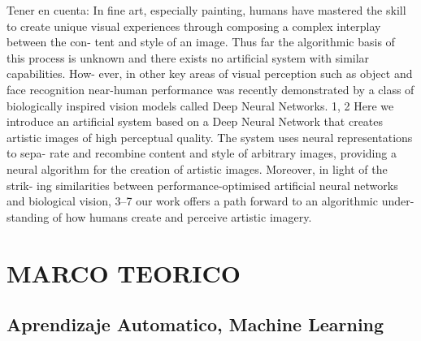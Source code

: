 \documentclass[a4paper,10pt]{article}
\begin{document}
Tener en cuenta:
In fine art, especially painting, humans have mastered the skill to create unique
visual experiences through composing a complex interplay between the con-
tent and style of an image. Thus far the algorithmic basis of this process is
unknown and there exists no artificial system with similar capabilities. How-
ever, in other key areas of visual perception such as object and face recognition
near-human performance was recently demonstrated by a class of biologically
inspired vision models called Deep Neural Networks. 1, 2 Here we introduce an
artificial system based on a Deep Neural Network that creates artistic images
of high perceptual quality. The system uses neural representations to sepa-
rate and recombine content and style of arbitrary images, providing a neural
algorithm for the creation of artistic images. Moreover, in light of the strik-
ing similarities between performance-optimised artificial neural networks and
biological vision, 3–7 our work offers a path forward to an algorithmic under-
standing of how humans create and perceive artistic imagery.

\section{MARCO TEORICO}




  \subsection{Aprendizaje Automatico, Machine Learning}
\end{document}
